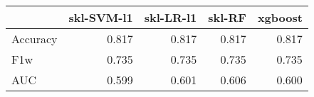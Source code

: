 \begin{tabular}{lrrrr}
\toprule
{} &  skl-SVM-l1 &  skl-LR-l1 &  skl-RF &  xgboost \\
\midrule
Accuracy &       0.817 &      0.817 &   0.817 &    0.817 \\
F1w      &       0.735 &      0.735 &   0.735 &    0.735 \\
AUC      &       0.599 &      0.601 &   0.606 &    0.600 \\
\bottomrule
\end{tabular}
